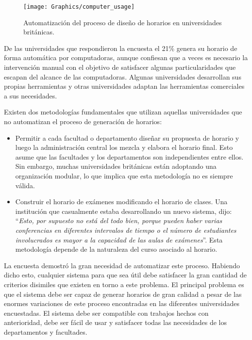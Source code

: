 \begin{figure}
	\begin{center}
		\texttt{[image: Graphics/computer\_usage]}
		\caption{Automatización del proceso de diseño de horarios en universidades británicas.}
	\end{center}	
\end{figure}

De las universidades que respondieron la encuesta el 21\% genera su horario de forma automática por
computadoras, aunque confiesan que a veces es necesario la intervención manual con el objetivo de satisfacer
algunas particularidades que escapan del alcance de las computadoras. Algunas universidades desarrollan
sus propias herramientas y otras universidades adaptan las herramientas comerciales a sus necesidades.

Existen dos metodologías fundamentales que utilizan aquellas universidades que no automatizan el proceso de
generación de horarios:

\begin{itemize}
	\item Permitir a cada facultad o departamento diseñar su propuesta de horario y luego la administración
		central los mezcla y elabora el horario final. Esto asume que las facultades y los departamentos
		son independientes entre ellos. Sin embargo, muchas universidades británicas están adoptando una
		organización modular, lo que implica que esta metodología no es siempre válida.
	\item Construir el horario de exámenes modificando el horario de clases. Una institución que casualmente
		estaba desarrollando un nuevo sistema, dijo: ``\emph{Esto, por supuesto no está del todo bien, porque
		pueden haber varias conferencias en diferentes intervalos de tiempo o el número de estudiantes involucrados
		es mayor a la capacidad de las aulas de exámenes}''. Esta metodología depende de la naturaleza del curso
		asociado al horario.
\end{itemize}

La encuesta demostró la gran necesidad de automatizar este proceso. Habiendo dicho esto, cualquier sistema
para que sea útil debe satisfacer la gran cantidad de criterios disimiles que existen en torno a este problema.
El principal problema es que el sistema debe ser capaz de generar horarios de gran calidad a pesar de las enormes
variaciones de este proceso encontradas en las diferentes universidades encuestadas. El sistema debe ser compatible
con trabajos hechos con anterioridad, debe ser fácil de usar y satisfacer todas las necesidades de los departamentos y facultades.

